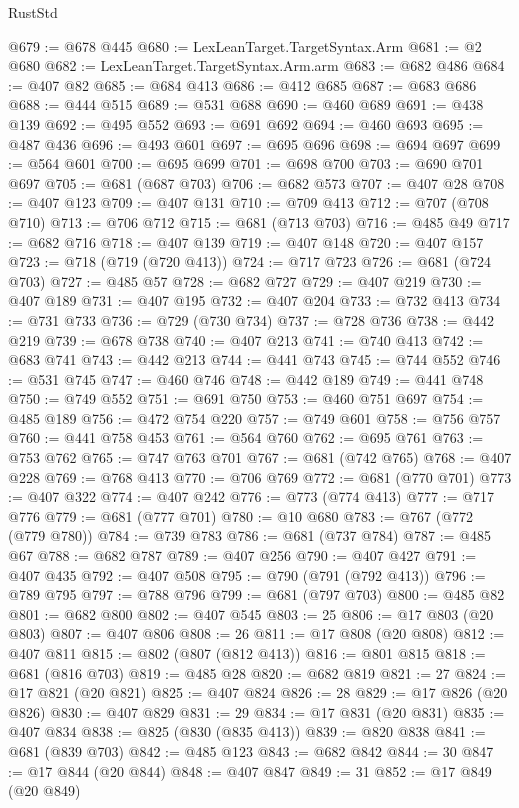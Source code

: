 \begin{lexlean}{RustStd}
\begin{coremodule}
{\begin{coremodule}
{{{{{{{{{{{{{{{{{{{{{{{{{{@679 := @678 @445
@680 := LexLeanTarget.TargetSyntax.Arm
@681 := @2 @680
@682 := LexLeanTarget.TargetSyntax.Arm.arm
@683 := @682 @486
@684 := @407 @82
@685 := @684 @413
@686 := @412 @685
@687 := @683 @686
@688 := @444 @515
@689 := @531 @688
@690 := @460 @689
@691 := @438 @139
@692 := @495 @552
@693 := @691 @692
@694 := @460 @693
@695 := @487 @436
@696 := @493 @601
@697 := @695 @696
@698 := @694 @697
@699 := @564 @601
@700 := @695 @699
@701 := @698 @700
@703 := @690 @701 @697
@705 := @681 (@687 @703)
@706 := @682 @573
@707 := @407 @28
@708 := @407 @123
@709 := @407 @131
@710 := @709 @413
@712 := @707 (@708 @710)
@713 := @706 @712
@715 := @681 (@713 @703)
@716 := @485 @49
@717 := @682 @716
@718 := @407 @139
@719 := @407 @148
@720 := @407 @157
@723 := @718 (@719 (@720 @413))
@724 := @717 @723
@726 := @681 (@724 @703)
@727 := @485 @57
@728 := @682 @727
@729 := @407 @219
@730 := @407 @189
@731 := @407 @195
@732 := @407 @204
@733 := @732 @413
@734 := @731 @733
@736 := @729 (@730 @734)
@737 := @728 @736
@738 := @442 @219
@739 := @678 @738
@740 := @407 @213
@741 := @740 @413
@742 := @683 @741
@743 := @442 @213
@744 := @441 @743
@745 := @744 @552
@746 := @531 @745
@747 := @460 @746
@748 := @442 @189
@749 := @441 @748
@750 := @749 @552
@751 := @691 @750
@753 := @460 @751 @697
@754 := @485 @189
@756 := @472 @754 @220
@757 := @749 @601
@758 := @756 @757
@760 := @441 @758 @453
@761 := @564 @760
@762 := @695 @761
@763 := @753 @762
@765 := @747 @763 @701
@767 := @681 (@742 @765)
@768 := @407 @228
@769 := @768 @413
@770 := @706 @769
@772 := @681 (@770 @701)
@773 := @407 @322
@774 := @407 @242
@776 := @773 (@774 @413)
@777 := @717 @776
@779 := @681 (@777 @701)
@780 := @10 @680
@783 := @767 (@772 (@779 @780))
@784 := @739 @783
@786 := @681 (@737 @784)
@787 := @485 @67
@788 := @682 @787
@789 := @407 @256
@790 := @407 @427
@791 := @407 @435
@792 := @407 @508
@795 := @790 (@791 (@792 @413))
@796 := @789 @795
@797 := @788 @796
@799 := @681 (@797 @703)
@800 := @485 @82
@801 := @682 @800
@802 := @407 @545
@803 := 25
@806 := @17 @803 (@20 @803)
@807 := @407 @806
@808 := 26
@811 := @17 @808 (@20 @808)
@812 := @407 @811
@815 := @802 (@807 (@812 @413))
@816 := @801 @815
@818 := @681 (@816 @703)
@819 := @485 @28
@820 := @682 @819
@821 := 27
@824 := @17 @821 (@20 @821)
@825 := @407 @824
@826 := 28
@829 := @17 @826 (@20 @826)
@830 := @407 @829
@831 := 29
@834 := @17 @831 (@20 @831)
@835 := @407 @834
@838 := @825 (@830 (@835 @413))
@839 := @820 @838
@841 := @681 (@839 @703)
@842 := @485 @123
@843 := @682 @842
@844 := 30
@847 := @17 @844 (@20 @844)
@848 := @407 @847
@849 := 31
@852 := @17 @849 (@20 @849)
}}}}}}}}}}}}}}}}}}}}}}}}}}
\end{coremodule}}
\end{coremodule}
\end{lexlean}
